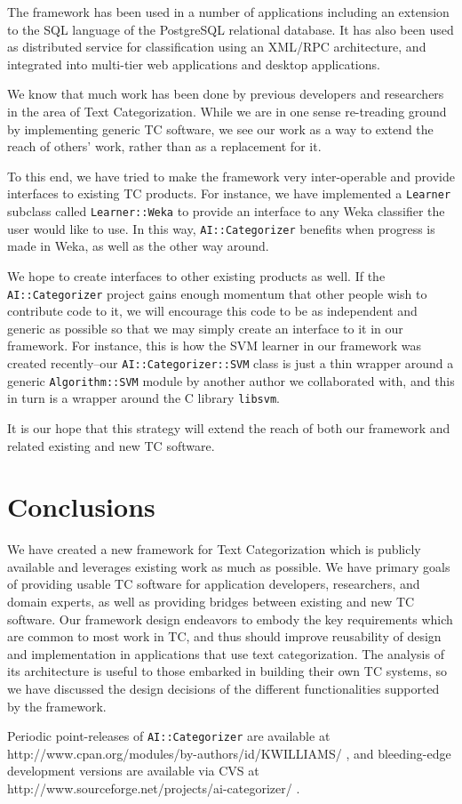\documentclass[a4paper,twocolumn]{article}
\begin{document}
The framework has been used in a number of applications including an
extension to the SQL language of the PostgreSQL relational
database. It has also been used as distributed service for
classification using an XML/RPC architecture, and integrated into
multi-tier web applications and desktop applications.

We know that much work has been done by previous developers and
researchers in the area of Text Categorization.  While we are in one
sense re-treading ground by implementing generic TC software, we see
our work as a way to extend the reach of others' work, rather than as
a replacement for it.

To this end, we have tried to make the framework very inter-operable
and provide interfaces to existing TC products.  For instance, we have
implemented a \texttt{Learner} subclass called \texttt{Learner::Weka}
to provide an interface to any Weka classifier the user would like to
use.  In this way, \texttt{AI::Categorizer} benefits when progress is
made in Weka, as well as the other way around.

We hope to create interfaces to other existing products as well.  If the
\texttt{AI::Categorizer} project gains enough momentum that other
people wish to contribute code to it, we will encourage this code to
be as independent and generic as possible so that we may simply
create an interface to it in our framework.  For instance, this is 
how the SVM learner in our framework was created recently--our
\texttt{AI::Categorizer::SVM} class is just a thin wrapper around a
generic \texttt{Algorithm::SVM} module by another author we
collaborated with, and this in turn is a wrapper around the C library
\texttt{libsvm}.

It is our hope that this strategy will extend the reach of both our
framework and related existing and new TC software.


\section{Conclusions}

We have created a new framework for Text Categorization which is
publicly available and leverages existing work as much as possible.
We have primary goals of providing usable TC software for application
developers, researchers, and domain experts, as well as providing
bridges between existing and new TC software.  Our framework design
endeavors to embody the key requirements which are common to most work
in TC, and thus should improve reusability of design and
implementation in applications that use text categorization.  The
analysis of its architecture is useful to those embarked in building
their own TC systems, so we have discussed the design decisions of the
different functionalities supported by the framework.

Periodic point-releases of \texttt{AI::Categorizer} are available at
http://www.cpan.org/modules/by-authors/id/KWILLIAMS/ , and
bleeding-edge development versions are available via CVS at
http://www.sourceforge.net/projects/ai-categorizer/ .




\end{document}
